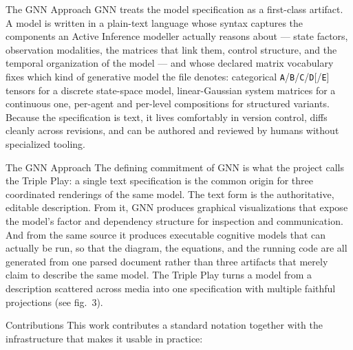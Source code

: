\documentclass[
  ignorenonframetext,
]{beamer}
\begin{document}
\begin{frame}{The GNN Approach}
\protect{}\label{the-gnn-approach}
GNN treats the model specification as a first-class artifact. A model is
written in a plain-text language whose syntax captures the components an
Active Inference modeller actually reasons about --- state factors,
observation modalities, the matrices that link them, control structure,
and the temporal organization of the model --- and whose declared matrix
vocabulary fixes which kind of generative model the file denotes:
categorical \texttt{A}/\texttt{B}/\texttt{C}/\texttt{D}{[}/\texttt{E}{]}
tensors for a discrete state-space model, linear-Gaussian system
matrices for a continuous one, per-agent and per-level compositions for
structured variants. Because the specification is text, it lives
comfortably in version control, diffs cleanly across revisions, and can
be authored and reviewed by humans without specialized tooling.

\end{frame}

\begin{frame}{The GNN Approach}
The defining commitment of GNN is what the project calls the Triple
Play: a single text specification is the common origin for three
coordinated renderings of the same model. The text form is the
authoritative, editable description. From it, GNN produces graphical
visualizations that expose the model's factor and dependency structure
for inspection and communication. And from the same source it produces
executable cognitive models that can actually be run, so that the
diagram, the equations, and the running code are all generated from one
parsed document rather than three artifacts that merely claim to
describe the same model. The Triple Play turns a model from a
description scattered across media into one specification with multiple
faithful projections (see fig.~3).
\end{frame}

\begin{frame}[allowframebreaks]{Contributions}
\protect{}\label{contributions}
This work contributes a standard notation together with the
infrastructure that makes it usable in practice:

\end{frame}
\end{document}
